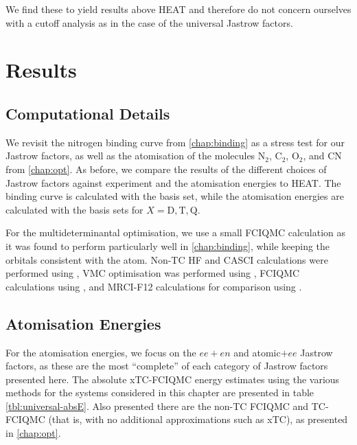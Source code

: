 We find these to yield results above HEAT and therefore do not concern ourselves with a cutoff analysis as in the case of the universal Jastrow factors.

\section{Results}

\subsection{Computational Details}

We revisit the nitrogen binding curve from \autoref{chap:binding} as a stress test for our Jastrow factors, as well as the atomisation of the molecules N$_2$, C$_2$, O$_2$, and CN from \autoref{chap:opt}. As before, we compare the results of the different choices of Jastrow factors against experiment\supercite{leroyAccurate2006} and the atomisation energies to HEAT.\supercite{fellerSurvey2008} The binding curve is calculated with the \avtz basis set, while the atomisation energies are calculated with the  basis sets for $X=\text{D},\text{T},\text{Q}$.

For the multideterminantal optimisation, we use a small FCIQMC calculation as it was found to perform particularly well in \autoref{chap:binding}, while keeping the orbitals consistent with the atom. Non-TC HF and CASCI calculations were performed using \pyscf,\supercite{sunPySCF2018} VMC optimisation was performed using \casino,\supercite{needsVariational2020} FCIQMC calculations using \neci,\supercite{gutherNECI2020} and MRCI-F12 calculations for comparison using \molpro.\supercite{wernerMOLPRO,wernerMolpro2012,wernerMolproQuantumChemistry2020}


\subsection{Atomisation Energies}
\label{sec:universal-atomisation}

For the atomisation energies, we focus on the $ee+en$ and atomic$+ee$ Jastrow factors, as these are the most ``complete'' of each category of Jastrow factors presented here. The absolute xTC-FCIQMC energy estimates using the various methods for the systems considered in this chapter are presented in table \ref{tbl:universal-absE}. Also presented there are the non-TC FCIQMC and TC-FCIQMC (that is, with no additional approximations such as xTC), as presented in \autoref{chap:opt}.

